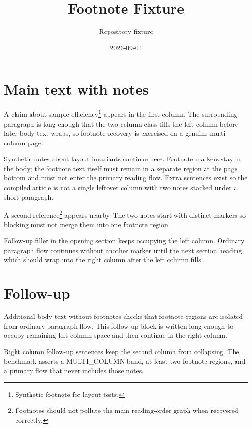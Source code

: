 \documentclass[11pt,a4paper,twocolumn]{article}
\title{Footnote Fixture}
\author{Repository fixture}
\date{2026-09-04}%
\begin{document}
\maketitle

\section{Main text with notes}
A claim about sample efficiency\footnote{Synthetic footnote for layout tests.}
appears in the first column. The surrounding paragraph is long enough that
the two-column class fills the left column before later body text wraps,
so footnote recovery is exercised on a genuine multi-column page.

Synthetic notes about layout invariants continue here. Footnote markers
stay in the body; the footnote text itself must remain in a separate
region at the page bottom and must not enter the primary reading flow.
Extra sentences exist so the compiled article is not a single leftover
column with two notes stacked under a short paragraph.

A second reference\footnote{Footnotes should not pollute the main reading-order
  graph when recovered correctly.} appears nearby. The two notes start with
distinct markers so blocking must not merge them into one footnote region.

Follow-up filler in the opening section keeps occupying the left column.
Ordinary paragraph flow continues without another marker until the next
section heading, which should wrap into the right column after the left
column fills.

\section{Follow-up}
Additional body text without footnotes checks that footnote regions are
isolated from ordinary paragraph flow. This follow-up block is written
long enough to occupy remaining left-column space and then continue in
the right column.

Right column follow-up sentences keep the second column from collapsing.
The benchmark asserts a MULTI\_COLUMN band, at least two footnote regions,
and a primary flow that never includes those notes.
\end{document}
